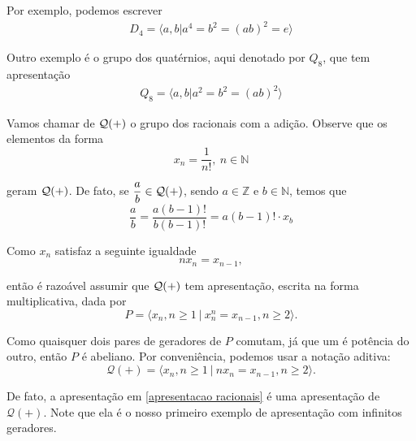 	\par\vspace{0.3cm} Por exemplo, podemos escrever 
	\begin{align}
	\label{apresentacao d4}
	    D_4 = \langle a,b | a^4 = b^2 = (ab)^2 = e \rangle
	\end{align}
	\par\vspace{0.3cm} Outro exemplo é o grupo dos quatérnios, aqui denotado por $Q_8$, que tem apresentação
	\begin{align}
	\label{apresentacao quaternios}
	    Q_8 = \langle a,b| a^2=b^2=(ab)^2 \rangle
	\end{align}
	\par\vspace{0.3cm} Vamos chamar de $\cal{Q}(+)$ o grupo dos racionais com a adição. 
	Observe que os elementos da forma
	\begin{equation*}
	    x_n = \frac{1}{n!}, \ n\in\mathbb{N}
	\end{equation*}
	\par\vspace{0.3cm} geram $\cal{Q}(+)$. De fato, se $\displaystyle{ \frac{a}{b}\in\cal{Q}(+) }$, 
	sendo $a\in\mathbb{Z}$ e $b\in\mathbb{N}$, temos que
	\begin{equation*}
	    \frac{a}{b} = \frac{a(b-1)!}{b(b-1)!} = a(b-1)!\cdot x_b
	\end{equation*}
	\par\vspace{0.3cm} Como $x_n$ satisfaz a seguinte igualdade
	\begin{equation*}
	    nx_n = x_{n-1},
	\end{equation*}
	\par\vspace{0.3cm} então é razoável assumir que $\cal{Q}(+)$ tem apresentação, escrita na forma
	multiplicativa, dada por
	\begin{equation*}
	    P = \langle x_n, n\geq 1 \ | \ x_n^n = x_{n-1}, n\geq 2 \rangle.
	\end{equation*}
	\par\vspace{0.3cm} Como quaisquer dois pares de geradores de $P$ comutam, já que um é potência do outro, 
	então $P$ é abeliano. Por conveniência, podemos usar a notação aditiva:
	\begin{equation}
	\label{apresentacao racionais}
	    \mathcal{Q}(+) = \langle x_n, n\geq 1 \ | \ nx_n = x_{n-1}, n\geq 2 \rangle.
	\end{equation}
	\par\vspace{0.3cm} De fato, a apresentação em \eqref{apresentacao racionais} é uma apresentação de
	$\mathcal{Q}(+)$. Note que ela é o nosso primeiro exemplo de apresentação com infinitos geradores.
	
